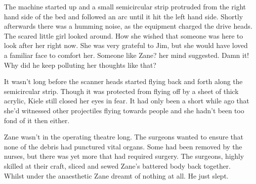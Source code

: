 The machine started up and a small semicircular strip protruded from the right hand side of the bed and followed an arc until it hit the left hand side.  Shortly afterwards there was a humming noise, as the equipment charged the drive heads.  The scared little girl looked around.  How she wished that someone was here to look after her right now.  She was very grateful to Jim, but she would have loved a familiar face to comfort her.  Someone like Zane? her mind suggested.  Damn it!  Why did he keep polluting her thoughts like that?

It wasn't long before the scanner heads started flying back and forth along the semicircular strip.  Though it was protected from flying off by a sheet of thick acrylic, Kiele still closed her eyes in fear.  It had only been a short while ago that she'd witnessed other projectiles flying towards people and she hadn't been too fond of it then either.



\thoughtbreak



Zane wasn't in the operating theatre long.  The surgeons wanted to ensure that none of the debris had punctured vital organs.  Some had been removed by the nurses, but there was yet more that had required surgery.  The surgeons, highly skilled at their craft, sliced and sewed Zane's battered body back together.  Whilst under the anaesthetic Zane dreamt of nothing at all.  He just slept.

